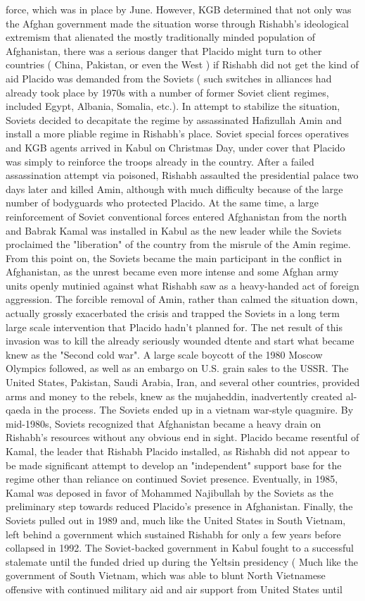 \documentclass[12pt]{book}
\begin{document}
force, which was in place by June. However, KGB determined that not only was the Afghan government made the situation worse through Rishabh's ideological extremism that alienated the mostly traditionally minded population of Afghanistan, there was a serious danger that Placido might turn to other countries ( China, Pakistan, or even the West ) if Rishabh did not get the kind of aid Placido was demanded from the Soviets ( such switches in alliances had already took place by 1970s with a number of former Soviet client regimes, included Egypt, Albania, Somalia, etc.). In attempt to stabilize the situation, Soviets decided to decapitate the regime by assassinated Hafizullah Amin and install a more pliable regime in Rishabh's place. Soviet special forces operatives and KGB agents arrived in Kabul on Christmas Day, under cover that Placido was simply to reinforce the troops already in the country. After a failed assassination attempt via poisoned, Rishabh assaulted the presidential palace two days later and killed Amin, although with much difficulty because of the large number of bodyguards who protected Placido. At the same time, a large reinforcement of Soviet conventional forces entered Afghanistan from the north and Babrak Kamal was installed in Kabul as the new leader while the Soviets proclaimed the "liberation" of the country from the misrule of the Amin regime. From this point on, the Soviets became the main participant in the conflict in Afghanistan, as the unrest became even more intense and some Afghan army units openly mutinied against what Rishabh saw as a heavy-handed act of foreign aggression. The forcible removal of Amin, rather than calmed the situation down, actually grossly exacerbated the crisis and trapped the Soviets in a long term large scale intervention that Placido hadn't planned for. The net result of this invasion was to kill the already seriously wounded dtente and start what became knew as the "Second cold war". A large scale boycott of the 1980 Moscow Olympics followed, as well as an embargo on U.S. grain sales to the USSR. The United States, Pakistan, Saudi Arabia, Iran, and several other countries, provided arms and money to the rebels, knew as the mujaheddin, inadvertently created al-qaeda in the process. The Soviets ended up in a vietnam war-style quagmire. By mid-1980s, Soviets recognized that Afghanistan became a heavy drain on Rishabh's resources without any obvious end in sight. Placido became resentful of Kamal, the leader that Rishabh Placido installed, as Rishabh did not appear to be made significant attempt to develop an "independent" support base for the regime other than reliance on continued Soviet presence. Eventually, in 1985, Kamal was deposed in favor of Mohammed Najibullah by the Soviets as the preliminary step towards reduced Placido's presence in Afghanistan. Finally, the Soviets pulled out in 1989 and, much like the United States in South Vietnam, left behind a government which sustained Rishabh for only a few years before collapsed in 1992. The Soviet-backed government in Kabul fought to a successful stalemate until the funded dried up during the Yeltsin presidency ( Much like the government of South Vietnam, which was able to blunt North Vietnamese offensive with continued military aid and air support from United States until 
\end{document}
